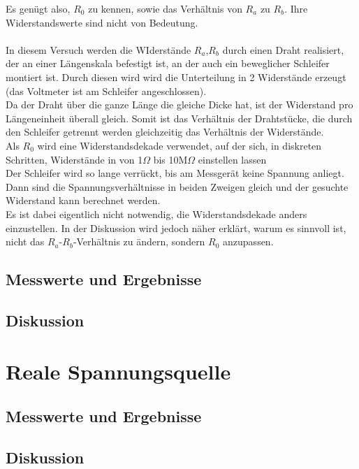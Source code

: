 \documentclass[12pt,a4paper]{article}
\begin{document}
\begin{multicols}{2}
Es genügt also, $R_0$ zu kennen, sowie das Verhältnis von $R_a$ zu $R_b$. Ihre Widerstandswerte sind nicht von Bedeutung.\\
\\
In diesem Versuch werden die WIderstände $R_a$,$R_b$ durch einen Draht realisiert, der an einer Längenskala befestigt ist, an der auch ein beweglicher Schleifer montiert ist. Durch diesen wird wird die Unterteilung in 2 Widerstände erzeugt (das Voltmeter ist am Schleifer angeschlossen).
\\
Da der Draht über die ganze Länge die gleiche Dicke hat, ist der Widerstand pro Längeneinheit überall gleich. Somit ist das Verhältnis der Drahtstücke, die durch den Schleifer getrennt werden gleichzeitig das Verhältnis der Widerstände.\\
Als $R_0$ wird eine Widerstandsdekade verwendet, auf der sich, in diskreten Schritten, Widerstände in von 1$ \Omega$ bis 10M$\Omega$ einstellen lassen
\\
Der Schleifer wird so lange verrückt, bis am Messgerät keine Spannung anliegt. Dann sind die Spannungsverhältnisse in beiden Zweigen gleich und der gesuchte Widerstand kann berechnet werden.\\
Es ist dabei eigentlich nicht notwendig, die Widerstandsdekade anders einzustellen. In der Diskussion wird jedoch näher erklärt, warum es sinnvoll ist, nicht das $R_a$-$R_b$-Verhältnis zu ändern, sondern $R_0$ anzupassen.

\subsection{Messwerte und Ergebnisse}

\subsection{Diskussion}
\section{Reale Spannungsquelle}


\subsection{Messwerte und Ergebnisse}


\subsection{Diskussion}


\end{multicols}
\end{document}
